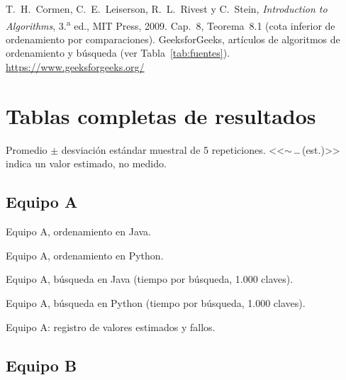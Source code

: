 \documentclass[11pt,a4paper]{article}
\begin{document}
\begin{thebibliography}{9}
 T.~H.~Cormen, C.~E.~Leiserson, R.~L.~Rivest y C.~Stein, \emph{Introduction to Algorithms},
  3.\textsuperscript{a} ed., MIT Press, 2009. Cap.~8, Teorema~8.1 (cota inferior de ordenamiento por comparaciones).
 GeeksforGeeks, art\'iculos de algoritmos de ordenamiento y b\'usqueda (ver Tabla~\ref{tab:fuentes}).
  \url{https://www.geeksforgeeks.org/}
\end{thebibliography}

\clearpage
\appendix
\section{Tablas completas de resultados}\label{anexo}

Promedio $\pm$ desviaci\'on est\'andar muestral de 5 repeticiones. <<$\sim$\,\ldots\,(est.)>> indica un valor
estimado, no medido.

\subsection{Equipo A}

\begin{table}[H]
\centering
\caption{Equipo A, ordenamiento en Java.}
\end{table}
\begin{table}[H]
\centering
\caption{Equipo A, ordenamiento en Python.}
\end{table}
\begin{table}[H]
\centering
\caption{Equipo A, b\'usqueda en Java (tiempo por b\'usqueda, 1.000 claves).}
\end{table}
\begin{table}[H]
\centering
\caption{Equipo A, b\'usqueda en Python (tiempo por b\'usqueda, 1.000 claves).}
\end{table}
\begin{table}[H]
\centering
\caption{Equipo A: registro de valores estimados y fallos.}\label{tab:issuesA}
\end{table}

\subsection{Equipo B}
\end{document}
